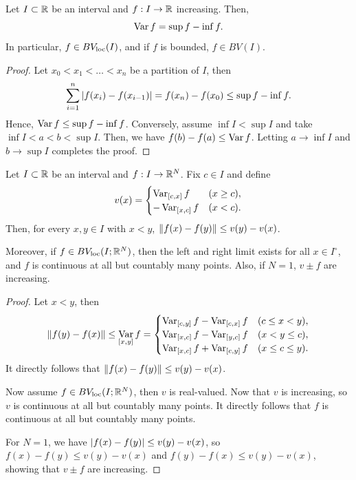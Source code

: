 \documentclass[a4paper]{article}
\begin{document}
\begin{thm}
  Let $I \subset \mathbb{R}$ be an interval and $f : I \to \mathbb{R}$ increasing. Then,
  \[
    \operatorname*{Var} f = \sup f - \inf f.
  \]
  In particular, $f \in BV_{\mathrm{loc}}(I)$, and if $f$ is bounded, $f \in
  BV(I)$.
\end{thm}

\begin{proof}
  Let $x_0 < x_1 < \dots < x_n$ be a partition of $I$, then
  \begin{align*}
    \sum_{i=1}^n \left\lvert f(x_i) - f(x_{i - 1})\right\rvert
    = f(x_n) - f(x_0)
    \leq \sup f - \inf f.
  \end{align*}
  Hence, $\operatorname*{Var} f \leq \sup f - \inf f$. Conversely, assume $\inf I < \sup
    I$ and take $\inf I < a < b < \sup I$. Then, we have $f(b) - f(a) \leq
    \operatorname*{Var} f$. Letting $a \to \inf I$ and $b \to \sup I$ completes the proof.
\end{proof}

\begin{thm}
  Let $I \subset \mathbb{R}$ be an interval and $f : I \to \mathbb{R}^N$. Fix $c \in I$
  and define
  \[
    v(x) = \begin{cases}
      \operatorname*{Var}_{[c, x]} f   & (x \geq c), \\
      - \operatorname*{Var}_{[x, c]} f & (x < c).
    \end{cases}
  \]
  Then, for every $x, y \in I$ with $x < y$, $\left\lVert f(x) - f(y)\right\rVert \leq v(y)
  - v(x)$.

  Moreover, if $f \in BV_{\mathrm{loc}} (I ; \mathbb{R}^N)$, then the left and right limit
  exists for all $x \in I^\circ$, and $f$ is continuous at all but
  countably many points. Also, if $N = 1$, $v \pm f$ are increasing.
\end{thm}

\begin{proof}
  Let $x < y$, then
  \begin{align*}
    \left\lVert f(y) - f(x)\right\rVert
    \leq \operatorname*{Var}_{[x, y]} f
    =
    \begin{cases}
      \operatorname*{Var}_{[c, y]} f - \operatorname*{Var}_{[c, x]} f & (c \leq x < y),    \\
      \operatorname*{Var}_{[x, c]} f - \operatorname*{Var}_{[y, c]} f & (x < y \leq c),    \\
      \operatorname*{Var}_{[x, c]} f + \operatorname*{Var}_{[c, y]} f & (x \leq c \leq y).
    \end{cases}
  \end{align*}
  It directly follows that $\left\lVert f(x) - f(y)\right\rVert \leq v(y) - v(x)$.

  Now assume $f \in BV_{\mathrm{loc}} (I ; \mathbb{R}^N)$, then $v$ is real-valued. Now
  that $v$ is increasing, so $v$ is continuous at all but countably many
  points. It directly follows that $f$ is continuous at all but countably
  many points.

  For $N = 1$, we have $\left\lvert f(x) - f(y)\right\rvert \leq v(y) - v(x)$, so $f(x) -
  f(y) \leq v(y) - v(x)$ and $f(y) - f(x) \leq v(y) - v(x)$, showing that
  $v \pm f$ are increasing.
\end{proof}
\end{document}
